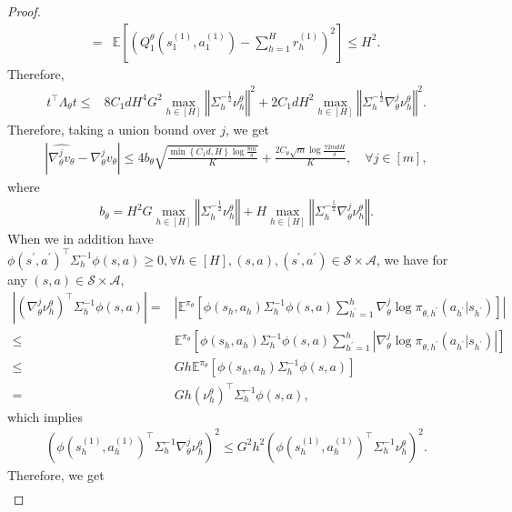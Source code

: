 \documentclass{article}
\numberwithin{equation}{section}
\begin{document}
\begin{proof}
\begin{align*}
    =&\mathbb{E}\left[\left(Q_1^\theta\left(s_1^{(1)},a_1^{(1)}\right)-\sum_{h=1}^Hr_h^{(1)}\right)^2\right]\leq H^2.
\end{align*}
Therefore, 
\begin{align*}
    t^\top \Lambda_\theta t \leq&8C_1dH^4G^2\max_{h\in[H]}\left\Vert\Sigma_h^{-\frac{1}{2}}\nu_h^\theta\right\Vert^2+2C_1dH^2\max_{h\in[H]}\left\Vert\Sigma_h^{-\frac{1}{2}}\nabla_\theta^j\nu_h^\theta\right\Vert^2.
\end{align*}
Therefore, taking a union bound over $j$, we get
\begin{align*}
\left\vert\widehat{\nabla_\theta^j v_\theta}-\nabla_\theta^j v_\theta\right\vert\leq 4b_\theta\sqrt{\frac{\min\left\{C_1d,H\right\}\log\frac{8m}{\delta}}{K}}+\frac{2C_\theta\sqrt{m}\log\frac{72mdH}{\delta}}{K},\quad\forall j\in[m],
\end{align*}
where 
\begin{align*}
b_\theta=H^2G\max_{h\in[H]}\left\Vert\Sigma_h^{-\frac{1}{2}}\nu_h^\theta\right\Vert+H\max_{h\in[H]}\left\Vert\Sigma_h^{-\frac{1}{2}}\nabla_\theta^j\nu_h^\theta\right\Vert.
\end{align*}
When we in addition have $\phi(s^\prime,a^\prime)^\top\Sigma_h^{-1}\phi(s,a)\geq 0,\forall h\in[H],(s,a),(s^\prime,a^\prime)\in\mathcal{S}\times\mathcal{A}$, we have for any $(s,a)\in\mathcal{S}\times\mathcal{A}$, 
\begin{align*}
    \left\vert\left(\nabla^j_\theta\nu^\theta_{h}\right)^\top\Sigma^{-1}_h\phi(s,a)\right\vert =& \left\vert\mathbb{E}^{\pi_\theta}\left[\phi(s_h,a_h)\Sigma^{-1}_h\phi(s,a)\sum_{h^\prime=1}^h\nabla_\theta^j\log\pi_{\theta,h^\prime}(a_{h^\prime}\vert s_{h^\prime})\right]\right\vert\\
    \leq&\mathbb{E}^{\pi_\theta}\left[\phi(s_h, a_h)\Sigma^{-1}_h\phi(s, a)\sum_{h^\prime=1}^h\left\vert\nabla_\theta^j\log\pi_{\theta,h^\prime}(a_{h^\prime}\vert s_{h^\prime})\right\vert\right]\\
    \leq&Gh\mathbb{E}^{\pi_\theta}\left[\phi(s_h,a_h)\Sigma^{-1}_h\phi(s,a)\right]\\
    =&Gh\left(\nu^\theta_{h}\right)^\top\Sigma^{-1}_h\phi(s,a),
\end{align*}
which implies
\begin{align*}
    \left(\phi\left(s_h^{(1)},a_h^{(1)}\right)^\top\Sigma_h^{-1}\nabla_\theta^j\nu_{h}^\theta\right)^2\leq G^2h^2\left(\phi\left(s_h^{(1)},a_h^{(1)}\right)^\top\Sigma_h^{-1}\nu_h^\theta\right)^2.
\end{align*}
Therefore, we get 
\begin{align*}

\end{align*}
\end{proof}
\end{document}
